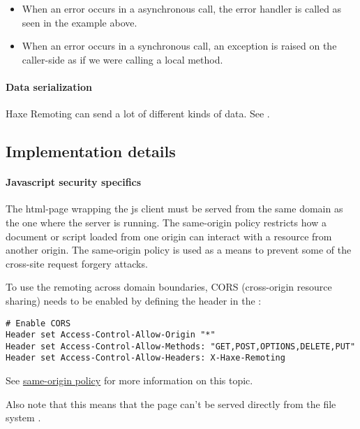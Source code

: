 \begin{itemize}
	\item When an error occurs in a asynchronous call, the error handler is called as seen in the example above.
	\item When an error occurs in a synchronous call, an exception is raised on the caller-side as if we were calling a local method.
\end{itemize}

\paragraph{Data serialization}

Haxe Remoting can send a lot of different kinds of data. See .

\subsection{Implementation details}
\label{std-remoting-implementation-details}

\paragraph{Javascript security specifics}

The html-page wrapping the js client must be served from the same domain as the one where the server is running. The same-origin policy restricts how a document or script loaded from one origin can interact with a resource from another origin. The same-origin policy is used as a means to prevent some of the cross-site request forgery attacks.

To use the remoting across domain boundaries, CORS (cross-origin resource sharing) needs to be enabled by defining the header  in the :

\begin{lstlisting} 
# Enable CORS
Header set Access-Control-Allow-Origin "*"
Header set Access-Control-Allow-Methods: "GET,POST,OPTIONS,DELETE,PUT"
Header set Access-Control-Allow-Headers: X-Haxe-Remoting
\end{lstlisting} 

See \href{http://en.wikipedia.org/wiki/Same-origin_policy}{same-origin policy} for more information on this topic.

Also note that this means that the page can't be served directly from the file system .

